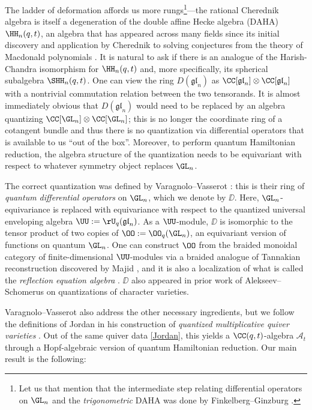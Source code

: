 The ladder of deformation affords us more rungs\footnote{Let us that mention that the intermediate step relating differential operators on $\GL_n$ and the \textit{trigonometric} DAHA was done by Finkelberg--Ginzburg \cite{FGCurve}.}---the rational Cherednik algebra is itself a degeneration of the double affine Hecke algebra (DAHA) $\HH_n(q,t)$, an algebra that has appeared across many fields since its initial discovery and application by Cherednik to solving conjectures from the theory of Macdonald polynomials \cite{ChereAnnals}.
It is natural to ask if there is an analogue of the Harish-Chandra isomorphism for $\HH_n(q,t)$ and, more specifically, its spherical subalgebra $\SHH_n(q,t)$.
One can view the ring $D(\mathfrak{gl}_n)$ as $\CC[\mathfrak{gl}_n]\otimes\CC[\mathfrak{gl}_n]$ with a nontrivial commutation relation between the two tensorands.
It is almost immediately obvious that $D(\mathfrak{gl}_n)$ would need to be replaced by an algebra quantizing $\CC[\GL_n]\otimes\CC[\GL_n]$; this is no longer the coordinate ring of a cotangent bundle and thus there is no quantization via differential operators that is available to us ``out of the box''.
Moreover, to perform quantum Hamiltonian reduction, the algebra structure of the quantization needs to be equivariant with respect to whatever symmetry object replaces $\GL_n$.

The correct quantization was defined by Varagnolo--Vasserot \cite{VarVassRoot}: this is their ring of \textit{quantum differential operators} on $\GL_n$, which we denote by $\DD$.
Here, $\GL_n$-equivariance is replaced with equivariance with respect to the quantized universal enveloping algebra $\UU:=\rU_q(\mathfrak{gl}_n)$.
As a $\UU$-module, $\DD$ is isomorphic to the tensor product of two copies of $\OO:=\OO_q(\GL_n)$, an equivariant version of functions on quantum $\GL_n$.
One can construct $\OO$ from the braided monoidal category of finite-dimensional $\UU$-modules via a braided analogue of Tannakian reconstruction discovered by Majid \cite{MajidBraided}, and it is also a localization of what is called the \textit{reflection equation algebra} \cite{DonMudRET}.
$\DD$ also appeared in prior work of Alekseev--Schomerus \cite{AlekScho} on quantizations of character varieties.

Varagnolo--Vasserot also address the other necessary ingredients, but we follow the definitions of Jordan in his construction of \textit{quantized multiplicative quiver varieties} \cite{JordanMult}.
Out of the same quiver data \eqref{Jordan}, this yields a $\CC(q,t)$-algebra $\mathcal{A}_t$ through a Hopf-algebraic version of quantum Hamiltonian reduction.
Our main result is the following:

